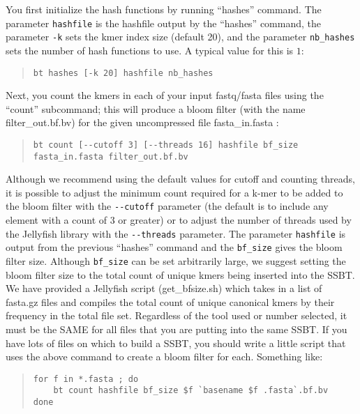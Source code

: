 \documentclass{article}
\begin{document}
You first initialize the hash functions by running ``hashes'' command. The parameter \verb+hashfile+ is the hashfile output by the ``hashes'' command, the parameter \verb+-k+ sets the kmer index size (default 20), and the parameter \verb+nb_hashes+ sets the number of hash functions to use. A typical value for this is $1$:
%
\begin{quote}
\begin{verbatim}
bt hashes [-k 20] hashfile nb_hashes
\end{verbatim}
\end{quote}

Next, you count the kmers in each of your input fastq/fasta files using the ``count'' subcommand; this will produce a bloom filter (with the name filter\_out.bf.bv) for the given uncompressed file fasta\_in.fasta :
%
\begin{quote}
\begin{verbatim}
bt count [--cutoff 3] [--threads 16] hashfile bf_size fasta_in.fasta filter_out.bf.bv
\end{verbatim}
\end{quote}
%
Although we recommend using the default values for cutoff and counting threads, it is possible to adjust the minimum count required for a k-mer to be added to the bloom filter with the \verb+--cutoff+ parameter (the default is to include any element with a count of 3 or greater) or to adjust the number of threads used by the Jellyfish library with the \verb+--threads+ parameter. The parameter \verb+hashfile+ is output from the previous ``hashes'' command and the \verb+bf_size+ gives the bloom filter size. Although \verb+bf_size+ can be set arbitrarily large, we suggest setting the bloom filter size to the total count of unique kmers being inserted into the SSBT. We have provided a Jellyfish script (get\_bfsize.sh) which takes in a list of fasta.gz files and compiles the total count of unique canonical kmers by their frequency in the total file set. Regardless of the tool used or number selected, it must be the SAME for all files that you are putting into the same SSBT. If you have lots of files on which to build a SSBT, you should write a little script that uses the above command to create a bloom filter for each. Something like:
%
\begin{quote}
\begin{verbatim}
for f in *.fasta ; do 
    bt count hashfile bf_size $f `basename $f .fasta`.bf.bv
done
\end{verbatim}
\end{quote}
\end{document}
